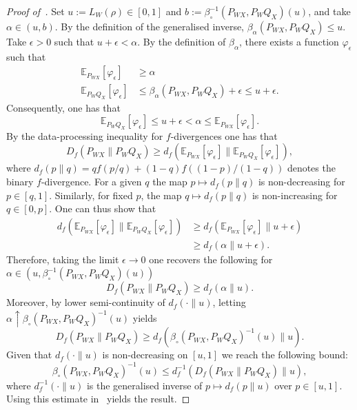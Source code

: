 \documentclass[11pt]{article}
\theoremstyle{definition}
\theoremstyle{remark}
\newcommand{\1}{\boldsymbol{1}}
\begin{document}
\begin{proof}[Proof of~]
Set \(u:=L_W(\rho)\in[0,1]\) and
\(b:=\beta_{\circ}^{-1}(P_{WX},P_WQ_X)(u)\), and take
\(\alpha\in(u,b)\). By the definition of the generalised inverse,
\(\beta_\alpha(P_{WX},P_WQ_X)\leq u\). Take \(\epsilon>0\) such that
\(u+\epsilon<\alpha\). By the definition of \(\beta_\alpha\), there
exists a function \(\varphi_\epsilon\) such that
\begin{align}
    \mathbb{E}_{P_{WX}}[\varphi_\epsilon]&\geq \alpha\\
    \mathbb{E}_{P_WQ_X}[\varphi_\epsilon] &\leq \beta_\alpha(P_{WX},P_WQ_X)+\epsilon \leq u+\epsilon.
\end{align}
Consequently, one has that
\begin{equation}
     \mathbb{E}_{P_WQ_X}[\varphi_\epsilon] \leq u+\epsilon < \alpha \leq  \mathbb{E}_{P_{WX}}[\varphi_\epsilon].
\end{equation}
By the data-processing inequality for $f$-divergences one has that
\begin{equation}
    D_f(P_{WX}\|P_WQ_X) \geq d_f(\mathbb{E}_{P_{WX}}[\varphi_\epsilon]\|\mathbb{E}_{P_WQ_X}[\varphi_\epsilon]),
\end{equation}
where $d_f(p\|q)=qf(p/q)+(1-q)f((1-p)/(1-q))$ denotes the binary $f$-divergence. For a given $q$ the map $p \mapsto d_f(p\|q)$ is non-decreasing for $p\in[q,1]$. Similarly, for fixed $p$, the map $q\mapsto d_f(p\|q)$ is non-increasing for $q\in [0,p]$. 
One can thus show that \begin{align}
    d_f(\mathbb{E}_{P_{WX}}[\varphi_\epsilon]\|\mathbb{E}_{P_WQ_X}[\varphi_\epsilon]) &\geq d_f(\mathbb{E}_{P_{WX}}[\varphi_\epsilon]\| u+\epsilon)\\
    &\geq d_f(\alpha\|u+\epsilon).
\end{align}
Therefore, taking the limit $\epsilon\to 0$ one recovers the following for $\alpha \in (u, \beta_{\circ}^{-1}(P_{WX},P_WQ_X)(u)) $
\begin{equation}
    D_f(P_{WX}\|P_WQ_X) \geq d_f(\alpha\|u).
\end{equation}
Moreover, by lower semi-continuity of $d_f(\cdot\|u)$, letting $\alpha \uparrow \beta_{\circ}(P_{WX},P_WQ_X)^{-1}(u)$ yields
\begin{equation}
    D_f(P_{WX}\|P_WQ_X) \geq d_f(\beta_{\circ}(P_{WX},P_WQ_X)^{-1}(u)\|u). 
\end{equation}
Given that $d_f(\cdot \|u)$ is non-decreasing on $[u,1]$ we reach the following bound:
\begin{equation}
    \beta_{\circ}(P_{WX},P_WQ_X)^{-1}(u) \leq d_{f}^{-1}(D_f(P_{WX}\|P_WQ_X)\|u),
\end{equation}
where $d_f^{-1}(\cdot \|u)$ is the generalised inverse of
$p\mapsto d_f(p\|u)$ over $p\in[u,1]$.
Using this estimate in~ yields the result.
\end{proof}
\end{document}
